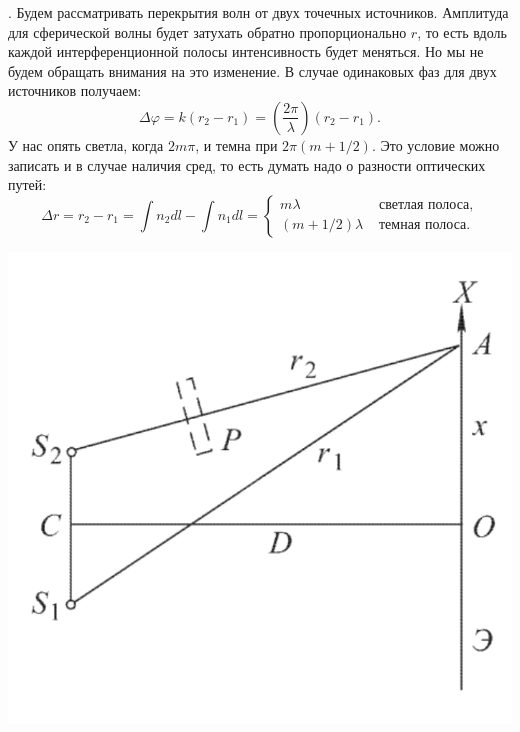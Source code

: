 . Будем рассматривать перекрытия волн от двух точечных источников. Амплитуда для сферической волны будет затухать обратно пропорционально $r$, то есть вдоль каждой интерференционной полосы  интенсивность будет меняться. Но мы не будем обращать внимания на это изменение.
В случае одинаковых фаз для двух источников получаем:
\begin{equation*}
	\Delta \varphi = k (r_2 - r_1) = \left(\frac{2 \pi}{\lambda}\right) (r_2 - r_1).
\end{equation*}
У нас опять светла, когда $2 m \pi$, и темна при $2 \pi (m +1/2)$. Это условие можно записать и в случае наличия сред, то есть думать надо о разности оптических путей:
\begin{equation*}
	\Delta r = r_2 - r_1 = \int n_2 d l - \int n_1 d l
	=
	\left\{
	\begin{aligned}
		m \lambda &\text{ светлая полоса}, \\
		(m+ 1/2)\lambda &\text{ темная полоса}.
	\end{aligned}
	\right.
\end{equation*}
\begin{minipage}{0.35\textwidth}
    \includegraphics[width=1\textwidth]{figures/s26_2.png}
\end{minipage}
\hfill
